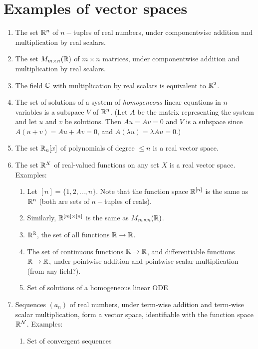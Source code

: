 \section{Examples of vector spaces}
\begin{enumerate}
\item The set $\mathbb{R}^n$ of $n-$tuples of real numbers, under componentwise
  addition and multiplication by real scalars.
\item The set $M_{m \times n}(\mathbb{R})$ of $m\times n$ matrices, under componentwise
  addition and multiplication by real scalars.
\item The field $\mathbb{C}$ with multiplication by real scalars is equivalent to $\mathbb{R}^2$.
\item The set of solutions of a system of \textit{homogeneous} linear equations
  in $n$ variables is a subspace $V$ of $\mathbb{R}^n$. (Let $A$ be the matrix
  representing the system and let $u$ and $v$ be solutions. Then $Au = Av = 0$
  and $V$ is a subspace since $A(u + v) = Au + Av = 0$, and
  $A(\lambda u) = \lambda Au = 0$.)
\item The set $\mathbb{R}_n[x]$ of polynomials of degree $\leq n$ is a real vector
  space.
\item The set $\mathbb{R}^X$ of real-valued functions on any set $X$ is a real vector
  space. Examples:
  \begin{enumerate}
  \item Let $[n] = \{1, 2, \ldots, n\}$. Note that the function space $\mathbb{R}^{[n]}$ is
    the same as $\mathbb{R}^n$ (both are sets of $n-$tuples of reals).
  \item Similarly, $\mathbb{R}^{[m]\times[n]}$ is the same as $M_{m \times n}(\mathbb{R})$.
  \item $\mathbb{R}^{\mathbb{R}}$, the set of all functions $\mathbb{R}\to\mathbb{R}$.
  \item The set of continuous functions $\mathbb{R} \to \mathbb{R}$, and differentiable functions
    $\mathbb{R} \to \mathbb{R}$, under pointwise addition and pointwise scalar multiplication
    (from any field?).
  \item Set of solutions of a homogeneous linear ODE
  \end{enumerate}
\item Sequences $(a_n)$ of real numbers, under term-wise addition and term-wise
  scalar multiplication, form a vector space, identifiable with the function
  space $\mathbb{R}^{\mathcal{N}}$. Examples:
  \begin{enumerate}
  \item Set of convergent sequences
  \end{enumerate}
\end{enumerate}
